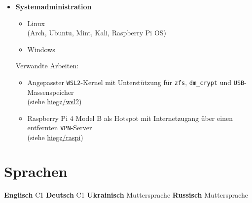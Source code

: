 \documentclass[]{article}
\begin{document}
\begin{minipage}[t]{0.49\linewidth}
    \begin{itemize}[leftmargin=0.15in, rightmargin=0.15in, label={}]
        \item {\large\bfseries Systemadministration}

            \begin{itemize}
                \item Linux \\ (Arch, Ubuntu, Mint, Kali, Raspberry Pi OS)
                \item Windows
            \end{itemize}
            Verwandte Arbeiten:
            \begin{itemize}
                \item Angepasster \verb|WSL2|-Kernel mit Unterstützung für \verb|zfs|, \verb|dm_crypt| und \verb|USB|-Massenspeicher \\
                    (siehe \href{https://github.com/hiegz/wsl2}{\ttfamily hiegz/wsl2})
                \item Raspberry Pi 4 Model B als Hotspot mit Internetzugang über einen entfernten \verb|VPN|-Server \\
                    (siehe \href{https://github.com/hiegz/raspi}{\ttfamily hiegz/raspi})
            \end{itemize}
    \end{itemize}
\end{minipage}

\vspace{5pt}
\section{Sprachen}

\hspace{0.15in}
\textbf{Englisch} \: C1 \hspace{20pt} \textbf{Deutsch} \: C1 \hspace{20pt} \textbf{Ukrainisch} \: Muttersprache \hspace{20pt} \textbf{Russisch} \: Muttersprache
\end{document}
